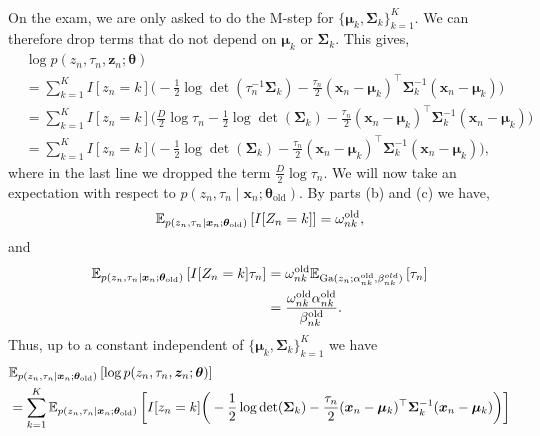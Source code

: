 \begin{enumerate}[label = (\alph*)]
\begin{align}
    \end{align}
    On the exam, we are only asked to do the M-step for $\{\bm{\mu}_k,\bm{\Sigma}_k\}_{k=1}^K$. We can therefore drop terms that do not depend on $\bm{\mu}_k$ or $\bm{\Sigma}_k$. This gives,
    \begin{align*}
        &\log p(z_n,\tau_n,\bm{z}_n;\bm{\theta})\\
        &=\sum_{k=1}^K I[z_n = k]\bigg(-\frac{1}{2}\log \det(\tau_n^{-1}\bm{\Sigma}_k) - \frac{\tau_n}{2}(\bm{x}_n - \bm{\mu}_k)^\top \bm{\Sigma}_k^{-1}(\bm{x}_n - \bm{\mu}_k) \bigg)\\
        &=\sum_{k=1}^K I[z_n = k]\bigg(\frac{D}{2}\log\tau_n-\frac{1}{2}\log \det(\bm{\Sigma}_k) - \frac{\tau_n}{2}(\bm{x}_n - \bm{\mu}_k)^\top \bm{\Sigma}_k^{-1}(\bm{x}_n - \bm{\mu}_k) \bigg)\\
        &=\sum_{k=1}^K I[z_n = k]\bigg(-\frac{1}{2}\log \det(\bm{\Sigma}_k) - \frac{\tau_n}{2}(\bm{x}_n - \bm{\mu}_k)^\top \bm{\Sigma}_k^{-1}(\bm{x}_n - \bm{\mu}_k) \bigg),
    \end{align*}
    where in the last line we dropped the term $\frac{D}{2}\log\tau_n$. We will now take an expectation with respect to $p(z_n,\tau_n\mid \bm{x}_n ;\bm{\theta}_{\mathrm{old}})$. By parts (b) and (c) we have,
    \begin{align*}
        {\mathbb E}_{p(z_n, \tau_n \mid \bm{x}_n;\bm{\theta}_{\mathrm{old}})}\left[I[Z_n = k]\right] = \omega_{nk}^{\mathrm{old}},
    \end{align*}
    and 
    \begin{align*}
    {\mathbb E}_{p(z_n,\tau_n \mid \bm{x}_n;\bm{\theta}_{\mathrm{old}})}\left[I[Z_n=k]\tau_n\right]
        &=\omega_{nk}^{\mathrm{old}}{\mathbb E}_{\mathrm{Ga}(z_n;\alpha_{nk}^{\text{old}}, \beta_{nk}^{old})}\left[\tau_n\right]\\
        &= \frac{\omega_{nk}^{\mathrm{old}}\alpha_{nk}^{\text{old}}}{\beta_{nk}^{\text{old}}}.
    \end{align*}
    Thus, up to a constant independent of $\{\bm{\mu}_k,\bm{\Sigma}_k\}_{k=1}^K$ we have
    \begin{align*}
        &\bbE_{p(z_n, \tau_n \mid \bm{x}_n;\bm{\theta}_{\mathrm{old}})}\left[\log p(z_n,\tau_n,\bm{z}_n;\bm{\theta})\right]\\
        &=\sum_{k=1}^K \bbE_{p(z_n, \tau_n \mid \bm{x}_n;\bm{\theta}_{\mathrm{old}})}\left[I[z_n = k]\bigg(-\frac{1}{2}\log \det(\bm{\Sigma}_k) - \frac{\tau_n}{2}(\bm{x}_n - \bm{\mu}_k)^\top \bm{\Sigma}_k^{-1}(\bm{x}_n - \bm{\mu}_k) \bigg)\right]\\

\end{align*}
\end{enumerate}
